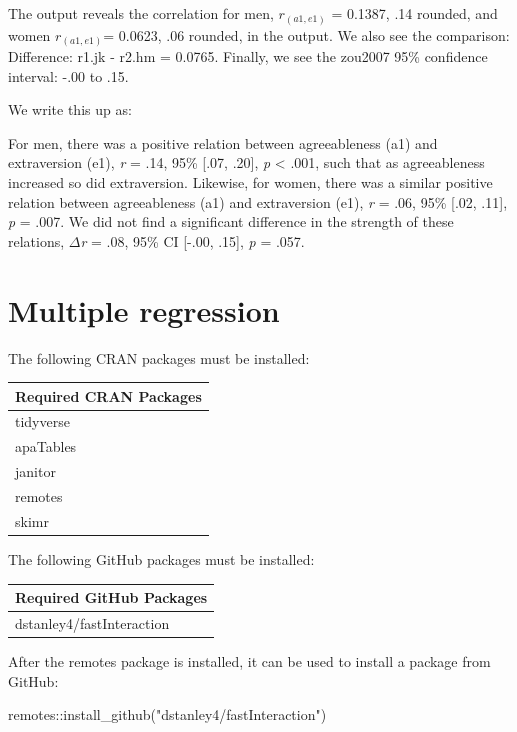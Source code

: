 \documentclass[
]{krantz}
\makeatletter
\newenvironment{Shaded}{\begin{snugshade}}{\end{snugshade}}
\newcommand{\FunctionTok}[1]{\textcolor[rgb]{0,0,0}{#1}}
\newcommand{\NormalTok}[1]{#1}
\newcommand{\SpecialCharTok}[1]{\textcolor[rgb]{0,0,0}{#1}}
\newcommand{\StringTok}[1]{\textcolor[rgb]{0.5,0.5,0.5}{#1}}
\newenvironment{kframe}{%
\medskip{}
\setlength{\fboxsep}{.8em}
 \def\at@end@of@kframe{}%
 \ifinner\ifhmode%
  \def\at@end@of@kframe{\end{minipage}}%
  \begin{minipage}{\columnwidth}%
 \fi\fi%
 \def\FrameCommand##1{\hskip\@totalleftmargin \hskip-\fboxsep
 \colorbox{shadecolor}{##1}\hskip-\fboxsep
     \hskip-\linewidth \hskip-\@totalleftmargin \hskip\columnwidth}%
 \MakeFramed {\advance\hsize-\width
   \@totalleftmargin\z@ \linewidth\hsize
   \@setminipage}}%
 {\par\unskip\endMakeFramed%
 \at@end@of@kframe}
\renewenvironment{Shaded}{\begin{kframe}}{\end{kframe}}
\makeatother
\begin{document}
The output reveals the correlation for men, \(r_{(a1, e1)}\) = 0.1387, .14 rounded, and women \(r_{(a1, e1)}\)= 0.0623, .06 rounded, in the output. We also see the comparison: Difference: r1.jk - r2.hm = 0.0765. Finally, we see the zou2007 95\% confidence interval: -.00 to .15.

We write this up as:

For men, there was a positive relation between agreeableness (a1) and extraversion (e1), \emph{r} = .14, 95\% {[}.07, .20{]}, \emph{p} \textless{} .001, such that as agreeableness increased so did extraversion. Likewise, for women, there was a similar positive relation between agreeableness (a1) and extraversion (e1), \emph{r} = .06, 95\% {[}.02, .11{]}, \emph{p} = .007. We did not find a significant difference in the strength of these relations, \(\Delta\)\emph{r} = .08, 95\% CI {[}-.00, .15{]}, \emph{p} = .057.

\hypertarget{multiple-regression}{%
\chapter{Multiple regression}\label{multiple-regression}}

The following CRAN packages must be installed:

\begin{longtable}[]{@{}l@{}}
\toprule
Required CRAN Packages \\
\midrule
\endhead
tidyverse \\
apaTables \\
janitor \\
remotes \\
skimr \\
\bottomrule
\end{longtable}

The following GitHub packages must be installed:

\begin{longtable}[]{@{}l@{}}
\toprule
Required GitHub Packages \\
\midrule
\endhead
dstanley4/fastInteraction \\
\bottomrule
\end{longtable}

After the remotes package is installed, it can be used to install a package from GitHub:

\begin{Shaded}
\begin{Highlighting}[]
\NormalTok{remotes}\SpecialCharTok{::}\FunctionTok{install\_github}\NormalTok{(}\StringTok{"dstanley4/fastInteraction"}\NormalTok{)}
\end{Highlighting}
\end{Shaded}
\end{document}
